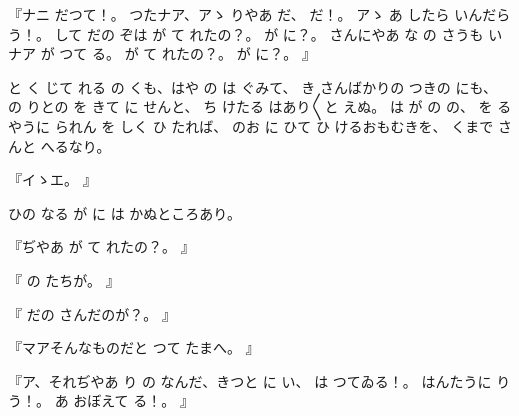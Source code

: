 『ナニ
だつて！。
つたナア、アゝ
りやあ
だ、
だ！。
アゝ
あ
したら
いんだらう！。
して
だの
ぞは
が
て
れたの？。
が
に？。
さんにやあ
な
の
さうも
いナア
が
つて
る。
が
て
れたの？。
が
に？。
』

と
く
じて
れる
の
くも、はや
の
は
ぐみて、
き
さんばかりの
つきの
にも、
の
りとの
を
きて
に
せんと、
ち
けたる
はあり〳〵と
えぬ。
は
が
の
の、
を
るやうに
られん
を
しく
ひ
たれば、
のお
に
ひて
ひ
けるおもむきを、
くまで
さんと
へるなり。

『イゝエ。
』

ひの
なる
が
に
は
かぬところあり。

『ぢやあ
が
て
れたの？。
』

『
の
たちが。
』

『
だの
さんだのが？。
』

『マアそんなものだと
つて
たまへ。
』

『ア、それぢやあ
り
の
なんだ、きつと
に
い、
は
つてゐる！。
はんたうに
り
う！。
あ
おぼえて
る！。
』

